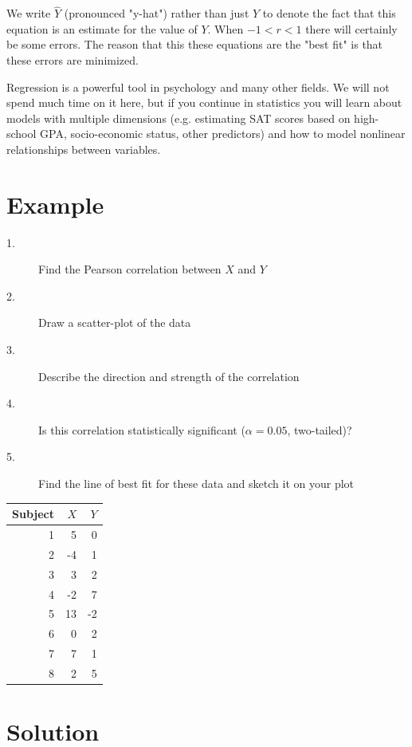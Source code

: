 \documentclass{tufte-handout}
\begin{document}
We write $\hat{Y}$ (pronounced "y-hat") rather than just $Y$ to denote the fact that this equation is an estimate for the value of $Y$. When $-1<r<1$ there will certainly be some errors. The reason that this these equations are the "best fit" is that these errors are minimized.

Regression is a powerful tool in psychology and many other fields. We will not spend much time on it here, but if you continue in statistics you will learn about models with multiple dimensions (e.g. estimating SAT scores based on high-school GPA, socio-economic status, other predictors) and how to model nonlinear relationships between variables.

\pagebreak
\section{Example}

\begin{description}
\item[1.] Find the Pearson correlation between $X$ and $Y$
\item[2.] Draw a scatter-plot of the data
\item[3.] Describe the direction and strength of the correlation
\item[4.] Is this correlation statistically significant ($\alpha=0.05$, two-tailed)?
\item[5.] Find the line of best fit for these data and sketch it on your plot
\end{description}

\begin{table}
  \centering
  \selectfont
  \begin{tabular}{rrr}
    \toprule
Subject& $X$ & $Y$\\
    \midrule
1&     5&     0\\
2&    -4&     1\\
3&     3&     2\\
4&    -2&     7\\
5&    13&    -2\\
6&     0 &    2\\
7&     7 &    1\\
8&     2 &    5\\
    \bottomrule
  \end{tabular}
  \label{tab:normaltab}
\end{table}

\pagebreak
\section{Solution}
\end{document}
